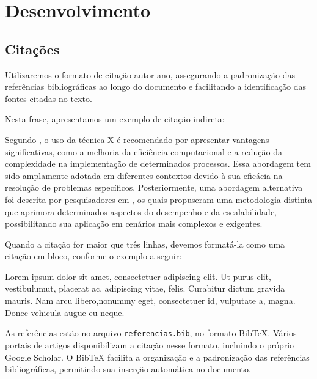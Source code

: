 \section{Desenvolvimento}

\subsection{Citações}

    Utilizaremos o formato de citação autor-ano, assegurando a padronização das referências bibliográficas ao longo do documento e facilitando a identificação das fontes citadas no texto.

    Nesta frase, apresentamos um exemplo de citação indireta:

    Segundo \cite{bianchi2021miint}, o uso da técnica X é recomendado por apresentar vantagens significativas, como a melhoria da eficiência computacional e a redução da complexidade na implementação de determinados processos. Essa abordagem tem sido amplamente adotada em diferentes contextos devido à sua eficácia na resolução de problemas específicos. Posteriormente, uma abordagem alternativa foi descrita por pesquisadores em \cite{vadlamudi2023implementing}, os quais propuseram uma metodologia distinta que aprimora determinados aspectos do desempenho e da escalabilidade, possibilitando sua aplicação em cenários mais complexos e exigentes.

    Quando a citação for maior que três linhas, devemos formatá-la como uma citação em bloco, conforme o exemplo a seguir:  

    \begin{citacao}
    Lorem ipsum dolor sit amet, consectetuer adipiscing elit. Ut purus elit, vestibulumut, placerat ac, adipiscing vitae, felis. Curabitur dictum gravida mauris. Nam arcu libero,nonummy eget, consectetuer id, vulputate a, magna. Donec vehicula augue eu neque. \cite{lamnaour2024semantic}
    \end{citacao}

    As referências estão no arquivo \texttt{referencias.bib}, no formato BibTeX. Vários portais de artigos disponibilizam a citação nesse formato, incluindo o próprio Google Scholar. O BibTeX facilita a organização e a padronização das referências bibliográficas, permitindo sua inserção automática no documento.  

